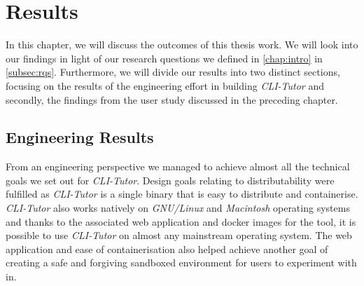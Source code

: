 \chapter{Results}
\label{chap:results}


%





In this chapter, we will discuss the outcomes of this thesis work. We will look
into our findings in light of our research questions we defined in
\autoref{chap:intro} in \autoref{subsec:rqs}. Furthermore, we will divide our
results into two distinct sections, focusing on the results of the engineering
effort in building \textit{CLI-Tutor} and secondly, the findings from the user
study discussed in the preceding chapter.


\section{Engineering Results}

From an engineering perspective we managed to achieve almost all the
technical goals we set out for \textit{CLI-Tutor}. Design goals relating to
distributability were fulfilled as \textit{CLI-Tutor} is a single binary that
is easy to distribute and containerise. \textit{CLI-Tutor} also works natively
on  \textit{GNU/Linux} and  \textit{Macintosh} operating systems and thanks to
the associated web application and docker images for the tool, it is possible
to use \textit{CLI-Tutor} on almost any mainstream operating system. The web
application and ease of containerisation also helped achieve another goal of
creating a safe and forgiving sandboxed environment for users to experiment
with in.

